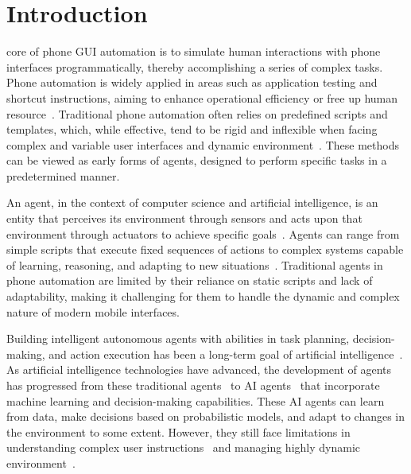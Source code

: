 \section{Introduction}
\label{sec:introduction}

 core of phone GUI automation is to simulate human interactions with phone interfaces programmatically, thereby accomplishing a series of complex tasks. Phone automation is widely applied in areas such as application testing and shortcut instructions, aiming to enhance operational efficiency or free up human resource~\cite{azim2013targeted,pan2020reinforcement,koroglu2018qbe,li2019humanoid,degott2019learning}. Traditional phone automation often relies on predefined scripts and templates, which, while effective, tend to be rigid and inflexible when facing complex and variable user interfaces and dynamic environment~\cite{arnatovich2018systematic,deshmukh2023automated,nass2024overcoming,nass2021many,tramontana2019automated}. These methods can be viewed as early forms of agents, designed to perform specific tasks in a predetermined manner.

An agent, in the context of computer science and artificial intelligence, is an entity that perceives its environment through sensors and acts upon that environment through actuators to achieve specific goals~\cite{li2024personal,guo2024large,wang2024survey,jin2024llms, bubeck2023sparks}. Agents can range from simple scripts that execute fixed sequences of actions to complex systems capable of learning, reasoning, and adapting to new situations~\cite{wang2024survey,jin2024llms,huang2024understanding}. Traditional agents in phone automation are limited by their reliance on static scripts and lack of adaptability, making it challenging for them to handle the dynamic and complex nature of modern mobile interfaces.

Building intelligent autonomous agents with abilities in task planning, decision-making, and action execution has been a long-term goal of artificial intelligence~\cite{albrecht2018autonomous}. As artificial intelligence technologies have advanced, the development of agents has progressed from these traditional agents~\cite{anscombe2000intention,dennett1988precis,shoham1993agent} to AI agents~\cite{poole2010artificial,inkster2018empathy,gao2018neural} that incorporate machine learning and decision-making capabilities. These AI agents can learn from data, make decisions based on probabilistic models, and adapt to changes in the environment to some extent. However, they still face limitations in understanding complex user instructions~\cite{luger2016like, amershi2014power} and managing highly dynamic environment~\cite{christiano2017deep, kohl2019mode}.



